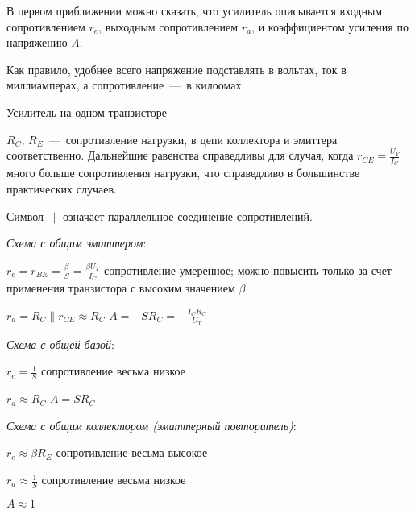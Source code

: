 \documentclass[
a4paper
,11pt
,landscape
,russian
,twocolumn
]{letter}
\newcommand\vsp{\vspace{.2in}}
\newcommand\tto{\tabto{2in}}
\begin{document}
В первом приближении можно сказать, что усилитель описывается
входным сопротивлением $r_e$, выходным сопротивлением $r_a$, и
коэффициентом усиления по напряжению $A$.

Как правило, удобнее всего напряжение подставлять в вольтах,
ток в миллиамперах, а сопротивление~---~в килоомах.

\vsp

\begin{Large}
	Усилитель на одном транзисторе
\end{Large}

\vsp

$R_C$, $R_E$~---~сопротивление нагрузки, в цепи коллектора и
эмиттера соответственно. Дальнейшие равенства справедливы для
случая, когда $r_{CE}=\frac{U_Y}{I_C}$ много больше сопротивления
нагрузки, что справедливо в большинстве практических случаев.

Символ $\|$ означает параллельное соединение сопротивлений.

\vsp

\begin{raggedright}

	\textit{Схема с общим эмиттером}:

	$r_e=r_{BE}=\frac{\beta}{S}=\frac{\beta U_T}{I_C}$
	\tto
	{\small сопротивление умеренное; можно повысить}
	\linebreak
	\tto
	{\small только за счет применения транзистора}
	\linebreak
	\tto
	{\small с высоким значением} $\beta$

	$r_a=R_C\|r_{CE}\approx R_C$
	\hspace{.2in}
	$A=-S R_C=-\frac{I_C R_C}{U_T}$

	\vsp

	\textit{Схема с общей базой}:

	$r_e=\frac{1}{S}$
	\tto
	{\small сопротивление весьма низкое}

	$r_a\approx R_C$
	\hspace{.2in}
	$A=S R_C$

	\vsp

	\textit{Схема с общим коллектором (эмиттерный повторитель)}:

	$r_e\approx\beta R_E$
	\tto
	{\small сопротивление весьма высокое}

	$r_a\approx\frac{1}{S}$
	\tto
	{\small сопротивление весьма низкое}

	$A\approx 1$

\end{raggedright}
\end{document}
